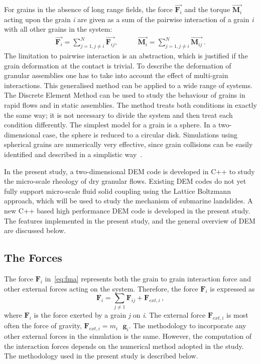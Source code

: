 For grains in the absence of long range fields, the force  
$\overrightarrow{\mathbf{F}_{i}}$ and the torque  
$\overrightarrow{\mathbf{M}_{i}}$ acting upon the grain \textit{i} are given as 
a sum of the pairwise interaction of a grain \textit{i} with 
all other grains in the system:
%
\begin{align}
   \overrightarrow{{\mathbf{F}}_i}=\sum\limits_{j=1,j\ne 
   i}^{N}{\overrightarrow{\mathbf{F}_{ij}}}, \qquad 
   &\overrightarrow{\mathbf{M}_{i}}=\sum\limits_{j=1,j\ne 
   i}^{N}{\overrightarrow{\mathbf{M}_{ij}}} \,.
\end{align}
%
The limitation to pairwise interaction is an abstraction, which is justified 
if the grain deformation at the contact is trivial. To describe the 
deformation of granular assemblies one has to take into account the effect of 
multi-grain interactions. This generalised method can be applied to a wide 
range of systems. The Discrete Element Method can be used to study the 
behaviour of grains in rapid flows and in static assemblies. The method treats 
both conditions in exactly the same way; it is not necessary to divide the 
system and then treat each condition differently. The simplest model for 
a grain is a sphere. In a two-dimensional case, the sphere is reduced to 
a circular disk. Simulations using spherical grains are numerically very 
effective, since grain collisions can be easily identified and described in 
a simplistic way~\citep{Poschel2005}.

In the present study, a two-dimensional DEM code is developed in C++ 
to study the micro-scale rheology of dry granular flows. Existing DEM codes do 
not yet fully support micro-scale fluid solid coupling using the Lattice 
Boltzmann approach, which will be used to study the mechanism of submarine 
landslides. A new C++ based high performance DEM code is developed in the 
present study. The features implemented in the present study, and the general 
overview of DEM are discussed below.

% 

\subsection{The Forces}

The force $\mathbf{F}_{\mathit{i}}$ in~\cref{eq:fma} represents both the grain 
to grain interaction force and other external forces acting on the system. 
Therefore, the force $\mathbf{F}_{\mathit{i}}$ is expressed as
%
\begin{equation} \label{eq:f}
 \mathbf{{F}}_{i}=\sum\limits_{j\ne 1}{\mathbf{{F}}_{ij}+\mathbf{{F}}_{ext, 
 i}}\,,
\end{equation}
%
where $\mathbf{F}_{\mathit{i}}$ is the force exerted by a grain \textit{j} on 
\textit{i}. The external force $\mathbf{F}_{\mathit{ext,i}}$ is most often the 
force of gravity, $\mathbf{F}_{\mathit{ext,i}} = m_{\mathit{i}} \mbox{ 
}\mathbf{g}_{\mathit{i}}$. The methodology to incorporate any other external 
forces in the simulation is the same. However, the computation of the 
interaction forces depends on the numerical method adopted in the study. 
The methodology used in the present study is described below. 

